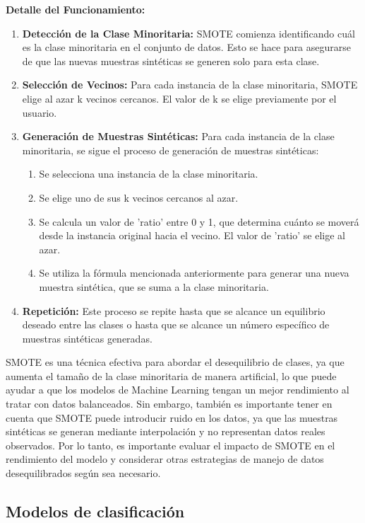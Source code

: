 \textbf{Detalle del Funcionamiento:}
\begin{enumerate}
\item \textbf{Detección de la Clase Minoritaria:} SMOTE comienza identificando cuál es la clase minoritaria en el conjunto de datos. Esto se hace para asegurarse de que las nuevas muestras sintéticas se generen solo para esta clase.
\item \textbf{Selección de Vecinos:} Para cada instancia de la clase minoritaria, SMOTE elige al azar k vecinos cercanos. El valor de k se elige previamente por el usuario.
\item \textbf{Generación de Muestras Sintéticas:} Para cada instancia de la clase minoritaria, se sigue el proceso de generación de muestras sintéticas:
    \begin{enumerate}
        \item Se selecciona una instancia de la clase minoritaria.
        \item Se elige uno de sus k vecinos cercanos al azar.
        \item Se calcula un valor de 'ratio' entre 0 y 1, que determina cuánto se moverá desde la instancia original hacia el vecino. El valor de 'ratio' se elige al azar.
        \item Se utiliza la fórmula mencionada anteriormente para generar una nueva muestra sintética, que se suma a la clase minoritaria.
    \end{enumerate}
\item \textbf{Repetición:} Este proceso se repite hasta que se alcance un equilibrio deseado entre las clases o hasta que se alcance un número específico de muestras sintéticas generadas.
\end{enumerate}

SMOTE es una técnica efectiva para abordar el desequilibrio de clases, ya que aumenta el tamaño de la clase minoritaria de manera artificial, lo que puede ayudar a que los modelos de Machine Learning tengan un mejor rendimiento al tratar con datos balanceados. Sin embargo, también es importante tener en cuenta que SMOTE puede introducir ruido en los datos, ya que las muestras sintéticas se generan mediante interpolación y no representan datos reales observados. Por lo tanto, es importante evaluar el impacto de SMOTE en el rendimiento del modelo y considerar otras estrategias de manejo de datos desequilibrados según sea necesario.



\subsection{Modelos de clasificación} \label{sub:modelos}

